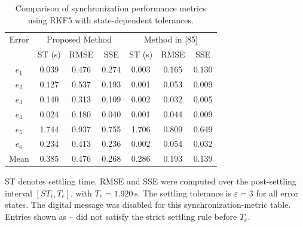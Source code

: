 \begin{table}[!t]
\centering
\caption{Comparison of synchronization performance metrics using RKF5 with state-dependent tolerances.}
\label{tab:t1_article_style_rkf}
\renewcommand{\arraystretch}{1.15}
\begin{tabular}{c|ccc|ccc}
\hline
Error & \multicolumn{3}{c|}{Proposed Method} & \multicolumn{3}{c}{Method in [85]} \\
 & ST (s) & RMSE & SSE & ST (s) & RMSE & SSE \\
\hline
$e_1$ & 0.039 & 0.476 & 0.274 & 0.003 & 0.165 & 0.130 \\
$e_2$ & 0.127 & 0.537 & 0.193 & 0.001 & 0.053 & 0.009 \\
$e_3$ & 0.140 & 0.313 & 0.109 & 0.002 & 0.032 & 0.005 \\
$e_4$ & 0.024 & 0.180 & 0.040 & 0.001 & 0.044 & 0.009 \\
$e_5$ & 1.744 & 0.937 & 0.755 & 1.706 & 0.809 & 0.649 \\
$e_6$ & 0.234 & 0.413 & 0.236 & 0.002 & 0.054 & 0.032 \\
Mean & 0.385 & 0.476 & 0.268 & 0.286 & 0.193 & 0.139 \\
\hline
\end{tabular}

\vspace{1mm}
\begin{minipage}{0.95\linewidth}
\footnotesize
ST denotes settling time. RMSE and SSE were computed over the post-settling interval $[ST_i,T_e]$, with $T_e=1.920\,\mathrm{s}$. The settling tolerance is $\varepsilon=3$ for all error states. The digital message was disabled for this synchronization-metric table. Entries shown as -- did not satisfy the strict settling rule before $T_e$.
\end{minipage}
\end{table}
